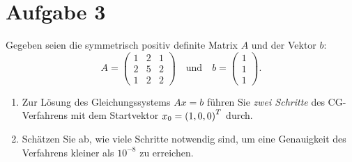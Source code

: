 \documentclass{exercise}
\begin{document}
    \section*{Aufgabe 3}
    
    \begin{problem}
        Gegeben seien die symmetrisch positiv definite Matrix \(A\) und der Vektor \(b\):
        \[
            A = \begin{pmatrix}
                1 & 2 & 1\\
                2 & 5 & 2\\
                1 & 2 & 2
            \end{pmatrix} \quad \text{und} \quad b = \begin{pmatrix}
                1\\
                1\\
                1
            \end{pmatrix}.
        \]
        \begin{enumerate}
            \item Zur Lösung des Gleichungssystems \(Ax = b\) führen Sie \emph{zwei Schritte} des CG-Verfahrens mit dem Startvektor \(x_0 = \parentheses*{1, 0, 0}^T\) durch.
            \item Schätzen Sie ab, wie viele Schritte notwendig sind, um eine Genauigkeit des Verfahrens kleiner als \(10^{-8}\) zu erreichen.
        \end{enumerate}
    \end{problem}
    
\end{document}
